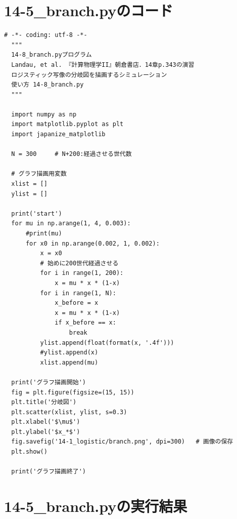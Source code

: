 \documentclass[a4paper, oneside]{jsarticle}
\begin{document}
\section{14-5\_branch.pyのコード}

\begin{lstlisting}[caption=14-8\_branch.py, label=branch]
  # -*- coding: utf-8 -*-
  """
  14-8_branch.pyプログラム
  Landau, et al. 『計算物理学II』朝倉書店．14章p.343の演習
  ロジスティック写像の分岐図を描画するシミュレーション
  使い方 14-8_branch.py
  """

  import numpy as np 
  import matplotlib.pyplot as plt 
  import japanize_matplotlib
  
  N = 300     # N+200:経過させる世代数
  
  # グラフ描画用変数
  xlist = []
  ylist = []
  
  print('start')
  for mu in np.arange(1, 4, 0.003):
      #print(mu)
      for x0 in np.arange(0.002, 1, 0.002):
          x = x0
          # 始めに200世代経過させる
          for i in range(1, 200):
              x = mu * x * (1-x)
          for i in range(1, N):
              x_before = x
              x = mu * x * (1-x)
              if x_before == x:
                  break
          ylist.append(float(format(x, '.4f')))
          #ylist.append(x)
          xlist.append(mu)
  
  print('グラフ描画開始')
  fig = plt.figure(figsize=(15, 15))
  plt.title('分岐図')
  plt.scatter(xlist, ylist, s=0.3)
  plt.xlabel('$\mu$')
  plt.ylabel('$x_*$')
  fig.savefig('14-1_logistic/branch.png', dpi=300)   # 画像の保存
  plt.show()
  
  print('グラフ描画終了')  
\end{lstlisting}

\section{14-5\_branch.pyの実行結果}
\end{document}
